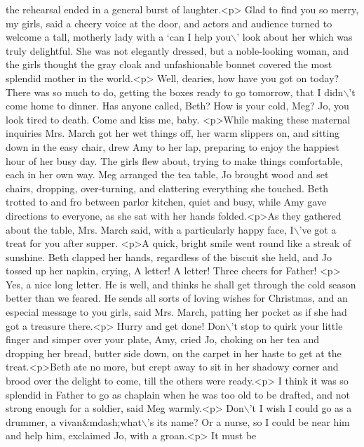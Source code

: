\begin{DoxyCode}
{       the rehearsal ended in a general burst of laughter.<p> Glad to find you so merry, my girls,  said a cheery
       voice at the door, and actors and audience turned to welcome a tall, motherly lady with a `can I help you\(\backslash\)'
       look about her which was truly delightful. She was not elegantly dressed, but a noble-looking woman, and the
       girls thought the gray cloak and unfashionable bonnet covered the most splendid mother in the world.<p>
       Well, dearies, how have you got on today? There was so much to do, getting the boxes ready to go tomorrow, that
       I didn\(\backslash\)'t come home to dinner. Has anyone called, Beth? How is your cold, Meg? Jo, you look tired to death.
       Come and kiss me, baby. <p>While making these maternal inquiries Mrs. March got her wet things off, her warm
       slippers on, and sitting down in the easy chair, drew Amy to her lap, preparing to enjoy the happiest hour
       of her busy day. The girls flew about, trying to make things comfortable, each in her own way. Meg arranged
       the tea table, Jo brought wood and set chairs, dropping, over-turning, and clattering everything she
       touched. Beth trotted to and fro between parlor kitchen, quiet and busy, while Amy gave directions to everyone, as
       she sat with her hands folded.<p>As they gathered about the table, Mrs. March said, with a particularly
       happy face,  I\(\backslash\)'ve got a treat for you after supper. <p>A quick, bright smile went round like a streak of
       sunshine. Beth clapped her hands, regardless of the biscuit she held, and Jo tossed up her napkin, crying,  A
       letter! A letter! Three cheers for Father! <p> Yes, a nice long letter. He is well, and thinks he shall get
       through the cold season better than we feared. He sends all sorts of loving wishes for Christmas, and an
       especial message to you girls,  said Mrs. March, patting her pocket as if she had got a treasure there.<p> Hurry
       and get done! Don\(\backslash\)'t stop to quirk your little finger and simper over your plate, Amy,  cried Jo, choking on
       her tea and dropping her bread, butter side down, on the carpet in her haste to get at the treat.<p>Beth ate
       no more, but crept away to sit in her shadowy corner and brood over the delight to come, till the others
       were ready.<p> I think it was so splendid in Father to go as chaplain when he was too old to be drafted, and
       not strong enough for a soldier,  said Meg warmly.<p> Don\(\backslash\)'t I wish I could go as a drummer, a
       vivan&mdash;what\(\backslash\)'s its name? Or a nurse, so I could be near him and help him,  exclaimed Jo, with a groan.<p> It must be
}
\end{DoxyCode}
